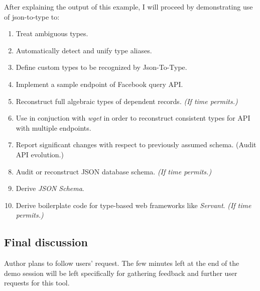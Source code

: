 \documentclass[11pt]{article}
\newcommand{\timePermits}[0]{\emph{(If time permits.)}}
\begin{document}
After explaining the output of this example, I will proceed by demonstrating use of json-to-type to:
\begin{enumerate}
\item Treat ambiguous types.
\item Automatically detect and unify type aliases.
\item Define custom types to be recognized by Json-To-Type.
\item Implement a sample endpoint of Facebook query API.
\item Reconstruct full algebraic types of dependent records. \timePermits{}
\item Use in conjuction with \emph{wget} in order to reconstruct consistent types for API with multiple endpoints.
\item Report significant changes with respect to previously assumed schema. (Audit API evolution.)
\item Audit or reconstruct JSON database schema. \timePermits{}
\item Derive \emph{JSON Schema}.
\item Derive boilerplate code for type-based web frameworks like \emph{Servant}. \timePermits{}
\end{enumerate}


\subsection*{Final discussion}
Author plans to follow users' request. The few minutes left at the end of the demo session will be left specifically for gathering feedback and further user requests for this tool.

\end{document}

